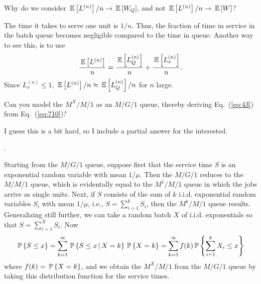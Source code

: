 \begin{question}
  Why do we consider $\E{L^{(n)}}/n \to \E{W_Q}$, and not
  $\E{L^{(n)}}/n \to \E W$? 
  \begin{solution}
    The time it takes to serve one unit is $1/n$. Thus, the fraction
    of time in service in the batch queue becomes negligible compared
    to the time in queue. Another way to see this, is to use 
    \begin{equation*}
      \frac{\E{L^{(n)}}}n = 
      \frac{\E{L^{(n)}_Q}}n + \frac{\E{L^{(n)}_s}}n.
    \end{equation*}
Since $L^{(n)}_s \leq 1$, $\E{L^{(n)}}/n \approx \E{L^{(n)}_Q}/n$ for $n$ large.
  \end{solution}
\end{question}

  
\begin{question}[use=false]
Can you model the $M^X/M/1$ as an $M/G/1$ queue, thereby deriving Eq.~(\ref{eq:43}) from Eq.~(\ref{eq:710})? 
  \begin{solution}
I guess this is a bit hard, so I include a partial answer for the interested. 

\TBD.

Starting from the $M/G/1$ queue, suppose first that the service time
$S$ is an exponential random variable with mean $1/\mu$.  Then the
$M/G/1$ reduces to the $M/M/1$ queue, which is evidentally equal to
the $M^1/M/1$ queue in which the jobs arrive as single units. Next, if
$S$ consists of the sum of $k$ i.i.d. exponential random variables
$S_i$ with mean $1/\mu$, i.e., $S=\sum_{i=1}^k S_i$, then the
$M^k/M/1$ queue results. Generalizing still further, we can take a
random batch $X$ of i.i.d. exponentials so that $S = \sum_{i=1}^X S_i$. Now
\begin{equation*}
  \P{S\leq x}
= \sum_{k=1}^\infty \P{S \leq x\given X=k}\P{X=k}
= \sum_{k=1}^\infty f(k) \P{\sum_{i=1}^k X_i \leq x}
\end{equation*}
where $f(k)=\P{X=k}$, and we obtain the $M^X/M/1$ from the $M/G/1$
queue by taking this distribution function for the service times.
  \end{solution}
\end{question}


